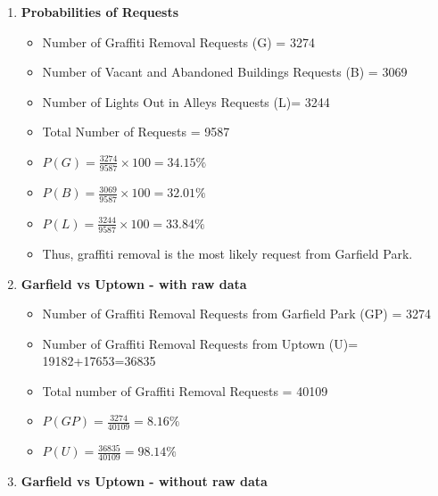 \documentclass[letterpaper,12pt]{article}
\begin{document}
\begin{enumerate}[label = \Alph*]
\item \textbf{Probabilities of Requests}
\begin{itemize}
\item Number of Graffiti Removal Requests (G) = 3274
\item Number of Vacant and Abandoned Buildings Requests (B) = 3069
\item Number of Lights Out in Alleys Requests (L)= 3244
\item Total Number of Requests = 9587
\item $P(G) = \frac{3274}{9587} \times 100 = 34.15\%$
\item $P(B) = \frac{3069}{9587} \times 100 = 32.01\%$
\item $P(L) = \frac{3244}{9587} \times 100 = 33.84\%$
\item Thus, graffiti removal is the most likely request from Garfield Park.
\end{itemize}

\item \textbf{Garfield vs Uptown - with raw data}
\begin{itemize}
\item Number of Graffiti Removal Requests from Garfield Park (GP) = 3274
\item Number of Graffiti Removal Requests from Uptown (U)= 19182+17653=36835
\item Total number of Graffiti Removal Requests = 40109
\item $P(GP) = \frac{3274}{40109} = 8.16 \%$
\item $P(U) = \frac{36835}{40109} = 98.14 \%$
\end{itemize}

\item \textbf{Garfield vs Uptown - without raw data}
\end{enumerate}
\end{document}
